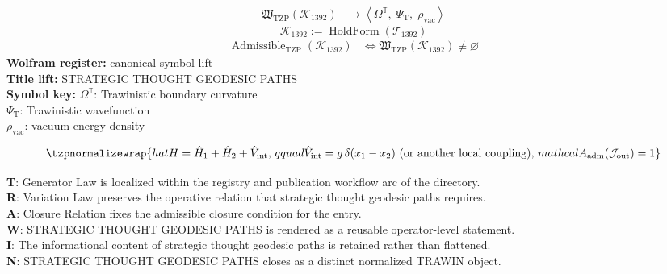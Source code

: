 \noindent
\begin{minipage}[t]{0.48\linewidth}
\begingroup
\small
\[
\begin{aligned}
\mathfrak{W}_{\mathrm{TZP}}\!\left(\mathcal{K}_{1392}\right)
&\longmapsto
\left\langle \Omega^{\mathbb{T}},\; \Psi_{\mathrm{T}},\; \rho_{\mathrm{vac}} \right\rangle
\end{aligned}
\]
\[
\mathcal{K}_{1392}
:=
\operatorname{HoldForm}\!\left(\mathcal{T}_{1392}\right)
\]
\[
\begin{aligned}
\operatorname{Admissible}_{\mathrm{TZP}}\!\left(\mathcal{K}_{1392}\right)
&\Longleftrightarrow
\mathfrak{W}_{\mathrm{TZP}}\!\left(\mathcal{K}_{1392}\right)\not\equiv\varnothing
\end{aligned}
\]
\textbf{Wolfram register:} canonical symbol lift\\
\textbf{Title lift:} STRATEGIC THOUGHT GEODESIC PATHS\\
\textbf{Symbol key:} \(\Omega^{\mathbb{T}}\): Trawinistic boundary curvature\\ \(\Psi_{\mathrm{T}}\): Trawinistic wavefunction\\ \(\rho_{\mathrm{vac}}\): vacuum energy density
\par
\endgroup
\end{minipage}\hfill
\begin{minipage}[t]{0.48\linewidth}
\[
\tzpnormalizewrap{hat H=\hat H_1+\hat H_2+ \hat V_{\text{int}},\,qquad \hat V_{\text{int}} = g\,\delta(x_1-x_2)\ \text{(or another local coupling)},\,mathcal{A}_{\mathrm{adm}}\!\left(\mathcal{J}_{\mathrm{out}}\right)=1}
\]

\small
\textbf{T}: Generator Law is localized within the registry and publication workflow arc of the directory.\\
\textbf{R}: Variation Law preserves the operative relation that strategic thought geodesic paths requires.\\
\textbf{A}: Closure Relation fixes the admissible closure condition for the entry.\\
\textbf{W}: STRATEGIC THOUGHT GEODESIC PATHS is rendered as a reusable operator-level statement.\\
\textbf{I}: The informational content of strategic thought geodesic paths is retained rather than flattened.\\
\textbf{N}: STRATEGIC THOUGHT GEODESIC PATHS closes as a distinct normalized TRAWIN object.
\normalsize
\end{minipage}

